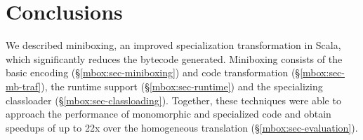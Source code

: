 \section{Conclusions}
\label{mbox:sec-conclusions}
We described miniboxing, an improved specialization transformation in Scala, which significantly reduces the bytecode generated. Miniboxing consists of the basic encoding (\S\ref{mbox:sec-miniboxing}) and code transformation (\S\ref{mbox:sec-mb-traf}), the runtime support (\S\ref{mbox:sec-runtime}) and the specializing classloader (\S\ref{mbox:sec-classloading}). Together, these techniques were able to approach the performance of monomorphic and specialized code and obtain speedups of up to 22x over the homogeneous translation (\S\ref{mbox:sec-evaluation}). 